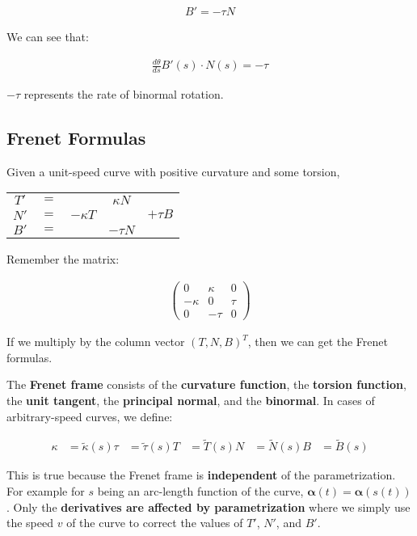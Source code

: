 \documentclass[11pt]{article}
\begin{document}
\begin{align*}
    B' = -\tau N
\end{align*}

We can see that:

\begin{align*}
    \frac{d\theta}{ds} B'\left(s\right) \cdot N\left(s\right) = -\tau
\end{align*}

\(-\tau\) represents the rate of binormal rotation.

\subsection{Frenet Formulas}
\label{sec:orgae7b6ca}
Given a unit-speed curve with positive curvature and some torsion,

\begin{center}
    \begin{tabular}{ c c c c c }
        $T'$ & $=$ & & $\kappa N$ & \\
        $N'$ & $=$ & $-\kappa T$ & & $+\tau B$ \\
        $B'$ & $=$ & & $-\tau N$ &
    \end{tabular}
\end{center}

Remember the matrix:

\begin{align*}
    \begin{pmatrix}
        0 & \kappa & 0 \\
        -\kappa & 0 & \tau \\
        0 & -\tau & 0
    \end{pmatrix}
\end{align*}

If we multiply by the column vector \(\left( T, N, B \right)^{T}\), then we can get the Frenet formulas.

The \textbf{Frenet frame} consists of the \textbf{curvature function}, the \textbf{torsion function}, the \textbf{unit tangent}, the \textbf{principal normal}, and the \textbf{binormal}. In cases of arbitrary-speed curves, we define:

\begin{align*}
    \kappa &= \tilde{\kappa}\left(s\right)
    \tau &= \tilde{\tau}\left(s\right)
    T &= \tilde{T}\left(s\right)
    N &= \tilde{N}\left(s\right)
    B &= \tilde{B}\left(s\right)
\end{align*}

This is true because the Frenet frame is \textbf{independent} of the parametrization. For example for \(s\) being an arc-length function of the curve, \(\boldsymbol{\alpha}\left(t\right) = \boldsymbol{\alpha}\left(s\left(t\right)\right)\). Only the \textbf{derivatives are affected by parametrization} where we simply use the speed \(v\) of the curve to correct the values of \(T'\), \(N'\), and \(B'\).
\end{document}

